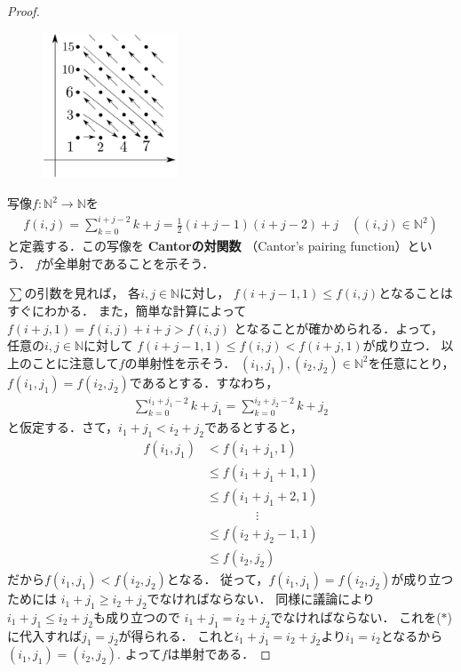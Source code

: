    \begin{proof}
     \begin{figure}[h]
       \centering
       \includegraphics[width=4cm]{inputyou/cardinal/picture/n2casan.pdf}
     \end{figure}

     写像$f: \mathbb{N}^2 \longrightarrow \mathbb{N} $を
     \begin{align*}
       f(i,j) = \sum_{k=0}^{i+j-2} k + j = \frac{1}{2}(i+j-1)(i+j-2)+j 
       \quad ( (i,j) \in \mathbb{N}^2) 
     \end{align*}
     と定義する．この写像を
     \textbf{Cantorの対関数}
     （Cantor's pairing function）という．
     $f$が全単射であることを示そう．

     $\sum$の引数を見れば，
     各$i,j \in \mathbb{N}$に対し，
     $f(i+j-1,1) \leq f(i,j) $となることはすぐにわかる．
     また，簡単な計算によって$f(i+j,1) = f(i,j) + i+j > f(i,j)$
     となることが確かめられる．よって，
     任意の$i,j \in \mathbb{N}$に対して
     $f(i+j-1,1) \leq f(i,j) < f(i+j,1) $が成り立つ．
     以上のことに注意して$f$の単射性を示そう．
     $(i_1, j_1), ( i_2 ,j_2) \in \mathbb{N}^2 $を任意にとり，
     $f(i_1, j_1) = f(i_2, j_2)$であるとする．すなわち，
     \begin{align}
       \sum_{k=0}^{i_1+j_1-2} k + j_1 = \sum_{k=0}^{i_2+j_2 -2} k + j_2 
       \tag{$\ast$}
     \end{align}
     と仮定する．さて，$i_1+j_1<i_2+j_2$であるとすると，
     \begin{align*}
       f(i_1,j_1) & < f( i_1+j_1,1)  \\
                  & \leq f( i_1 + j_1 +1 ,1 ) \\
                  & \leq f(i_1 + j_1 + 2,1) \\
                  & \qquad \qquad \vdots \\
                  & \leq f(i_2+ j_2 -1 ,1 ) \\
                  & \leq f(i_2,j_2)
     \end{align*}
     だから$f(i_1,j_1) < f(i_2 , j_2)$となる．
     従って，$f(i_1,j_1) = f(i_2,j_2)$が成り立つためには
     $i_1+j_1 \geq i_2 + j_2$でなければならない．
     同様に議論により$i_1 + j_1 \leq i_2 + j_2$も成り立つので
     $i_1 + j_1 = i_2 + j_2$でなければならない．
     これを($\ast$)に代入すれば$j_1=j_2$が得られる．
     これと$i_1+j_1=i_2+j_2$より$i_1=i_2$となるから$(i_1,j_1)=(i_2,j_2).$
     よって$f$は単射である．


\end{proof}
